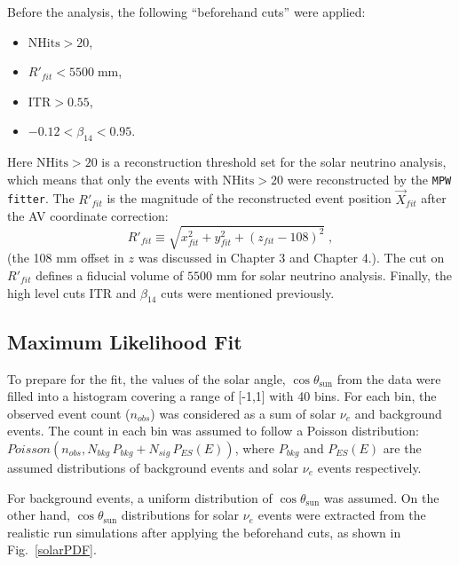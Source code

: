 Before the analysis, the following ``beforehand cuts'' were applied: 
\begin{itemize}
    \item $\mathrm{NHits}>20$\;, 
    \item $R'_{fit}<5500 \; \mathrm{mm}$\;,
    \item $\mathrm{ITR}>0.55$\;,
    \item $-0.12<\beta_{14}<0.95$\;. 
\end{itemize}
Here $\mathrm{NHits}>20$ is a reconstruction threshold set for the solar neutrino analysis, which means that only the events with $\mathrm{NHits}>20$ were reconstructed by the \texttt{MPW fitter}. The $R'_{fit}$ is the magnitude of the reconstructed event position $\vec{X}_{fit}$ after the AV coordinate correction:
\begin{equation*}
R'_{fit}\equiv\sqrt{x^2_{fit}+y^2_{fit}+(z_{fit}-108)^2}\;, 
\end{equation*}
(the 108 mm offset in $z$ was discussed in Chapter 3 and Chapter 4.). The cut on $R'_{fit}$ defines a fiducial volume of $5500$ mm for solar neutrino analysis. Finally, the high level cuts ITR and $\beta_{14}$ cuts were mentioned previously.

\subsection{Maximum Likelihood Fit}\label{sect:poisson_fit}

To prepare for the fit, the values of the solar angle, $\cos\theta_\mathrm{sun}$ from the data were filled into a histogram covering a range of [-1,1] with 40 bins. For each bin, the observed event count ($n_{obs}$) was considered as a sum of solar $\nu_e$ and background events. The count in each bin was assumed to follow a Poisson distribution: $Poisson(n_{obs}, N_{bkg} \, P_{bkg}+N_{sig} \, P_{ES}(E))$, where $P_{bkg}$ and $P_{ES}(E)$ are the assumed distributions of background events and solar $\nu_e$ events respectively.

For background events, a uniform distribution of $\cos\theta_\mathrm{sun}$ was assumed. On the other hand, $\cos\theta_\mathrm{sun}$ distributions for solar $\nu_e$ events were extracted from the realistic run simulations after applying the beforehand cuts, as shown in Fig.~\ref{solarPDF}. 

